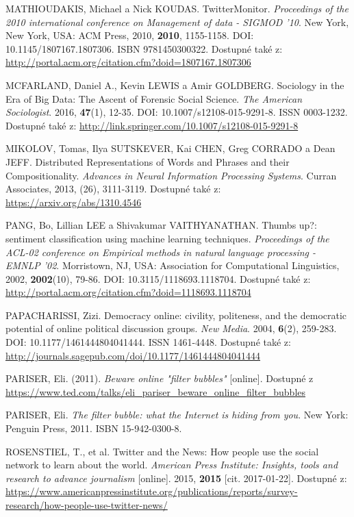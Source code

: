 \documentclass[12pt, a4paper]{article}
\numberwithin{equation}{section} 	%
\begin{document}
\begin{thebibliography}{99}
    MATHIOUDAKIS, Michael a Nick KOUDAS. TwitterMonitor. \textit{Proceedings of the 2010 international conference on Management of data - SIGMOD '10}. New York, New York, USA: ACM Press, 2010, \textbf{2010}, 1155-1158. DOI: 10.1145/1807167.1807306. ISBN 9781450300322. Dostupné také z: \url{http://portal.acm.org/citation.cfm?doid=1807167.1807306}

    MCFARLAND, Daniel A., Kevin LEWIS a Amir GOLDBERG. Sociology in the Era of Big Data: The Ascent of Forensic Social Science. \textit{The American Sociologist}. 2016, \textbf{47}(1), 12-35. DOI: 10.1007/s12108-015-9291-8. ISSN 0003-1232. Dostupné také z: \url{http://link.springer.com/10.1007/s12108-015-9291-8}

    MIKOLOV, Tomas, Ilya SUTSKEVER, Kai CHEN, Greg CORRADO a Dean JEFF. Distributed Representations of Words and Phrases and their Compositionality. \textit{Advances in Neural Information Processing Systems}. Curran Associates, 2013, (26), 3111-3119. Dostupné také z: \url{https://arxiv.org/abs/1310.4546}

    PANG, Bo, Lillian LEE a Shivakumar VAITHYANATHAN. Thumbs up?: sentiment classification using machine learning techniques. \textit{Proceedings of the ACL-02 conference on Empirical methods in natural language processing - EMNLP '02}. Morristown, NJ, USA: Association for Computational Linguistics, 2002, \textbf{2002}(10), 79-86. DOI: 10.3115/1118693.1118704. Dostupné také z: \url{http://portal.acm.org/citation.cfm?doid=1118693.1118704}

    PAPACHARISSI, Zizi. Democracy online: civility, politeness, and the democratic potential of online political discussion groups. \textit{New Media}. 2004, \textbf{6}(2), 259-283. DOI: 10.1177/1461444804041444. ISSN 1461-4448. Dostupné také z: \url{http://journals.sagepub.com/doi/10.1177/1461444804041444}

    PARISER, Eli. (2011). \textit{Beware online "filter bubbles"} [online]. Dostupné z \url{https://www.ted.com/talks/eli_pariser_beware_online_filter_bubbles}

    PARISER, Eli. \textit{The filter bubble: what the Internet is hiding from you}. New York: Penguin Press, 2011. ISBN 15-942-0300-8.

    ROSENSTIEL, T., et al. Twitter and the News: How people use the social network to learn about the world. \textit{American Press Institute: Insights, tools and research to advance journalism} [online]. 2015, \textbf{2015} [cit. 2017-01-22]. Dostupné z: \url{https://www.americanpressinstitute.org/publications/reports/survey-research/how-people-use-twitter-news/}


\end{thebibliography}
\end{document}

